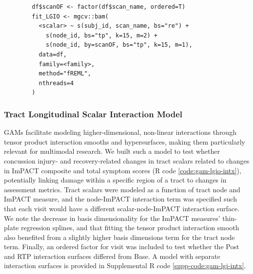\documentclass[12pt]{article}
\begin{document}
\begin{equ}[H]
	\begin{lstlisting}
		df$scanOF <- factor(df$scan_name, ordered=T)
		fit_LGIO <- mgcv::bam(
		  <scalar> ~ s(subj_id, scan_name, bs="re") +
		    s(node_id, bs="tp", k=15, m=2) +
		    s(node_id, by=scanOF, bs="tp", k=15, m=1),
		  data=df,
		  family=<family>,
		  method="fREML",
		  nthreads=4
		)
	\end{lstlisting}
	\caption{Tract scalars are modeled as a function of tract node with thin-plate regression splines using both global and group (\lstinline{scan_name}) smooths as well as individual group wiggliness. An ordered factor of scan visit was used to compare Post and RTP to Base. \lstinline{<scalar>} = relevant DWI metric (AD, RD, MD, or FA), \lstinline{scan_name} = visit identifier factor (Base, Post, RTP), \lstinline{scanOF} = ordered factor of \lstinline{scan_name}, \lstinline{<family>} = relevant family and link function for scalar distribution.}
	\label{code:gam-lgio}
\end{equ}


\subsubsection{Tract Longitudinal Scalar Interaction Model}
\label{sssec:meth-gam-lgio-intx}
GAMs facilitate modeling higher-dimensional, non-linear interactions through tensor product interaction smooths and hypersurfaces, making them particularly relevant for multimodal research. We built such a model to test whether concussion injury- and recovery-related changes in tract scalars related to changes in ImPACT composite and total symptom scores (R code \ref{code:gam-lgio-intx}), potentially linking damage within a specific region of a tract to changes in assessment metrics. Tract scalars were modeled as a function of tract node and ImPACT measure, and the node-ImPACT interaction term was specified such that each visit would have a different scalar-node-ImPACT interaction surface. We note the decrease in basis dimensionality for the ImPACT measures' thin-plate regression splines, and that fitting the tensor product interaction smooth also benefited from a slightly higher basis dimensions term for the tract node term. Finally, an ordered factor for visit was included to test whether the Post and RTP interaction surfaces differed from Base. A model with separate interaction surfaces is provided in Supplemental R code \ref{supp-code:gam-lgi-intx}.
\end{document}

